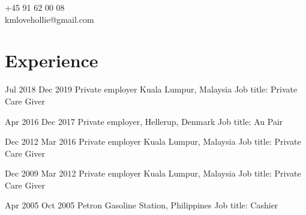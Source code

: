 \documentclass[11pt]{article} %
\begin{document}
{\begin{minipage}[t]{0.33\textwidth}
\begin{tabbing}
+45 91 62 00 08 \\ %
kmlovehollie@gmail.com \\ %
\end{tabbing}
\end{minipage}


\section{Experience}
\job
{Jul 2018 }{Dec 2019}
{Private employer Kuala Lumpur, Malaysia}
{}
{Job title: Private Care Giver}



\job
{Apr 2016 }{Dec 2017}
{Private employer, Hellerup, Denmark}
{}
{Job title: Au Pair}



\job
{Dec 2012 }{Mar 2016}
{Private employer Kuala Lumpur, Malaysia}
{}
{Job title: Private Care Giver}

\job
{Dec 2009 }{Mar 2012}
{Private employer Kuala Lumpur, Malaysia}
{}
{Job title: Private Care Giver}



\job
{Apr 2005 }{Oct 2005}
{Petron Gasoline Station, Philippines}
{}
{Job title: Cashier}



}
\end{document}
